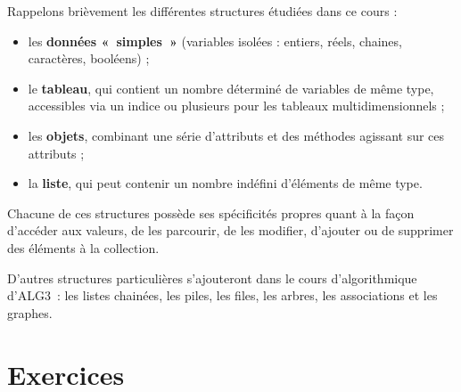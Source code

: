 	Rappelons brièvement les différentes structures étudiées dans ce cours
	 :
	\begin{itemize}
		\item 
			les \textbf{données «~simples~»} 
			(variables isolées : entiers, réels, chaines, caractères, booléens) ;
		\item 
			le \textbf{tableau}, 
			qui contient un nombre déterminé de variables de même type, 
			accessibles via un indice 
			ou plusieurs pour les tableaux multidimensionnels ;
		\item 
			les \textbf{objets}, 
			combinant une série d’attributs 
			et des méthodes agissant sur ces attributs ;
		\item 
			la \textbf{liste}, 
			qui peut contenir un nombre indéfini d’éléments de même type.
	\end{itemize}

	Chacune de ces structures possède ses spécificités propres quant à la
	façon d’accéder aux valeurs, de les parcourir, de les modifier,
	d’ajouter ou de supprimer des éléments à la collection. 

	D’autres structures particulières s’ajouteront 
	dans le cours d'algorithmique d'ALG3~: 
	les listes chainées, les piles, les files, les arbres, les associations et les graphes.
	
\section{Exercices}

